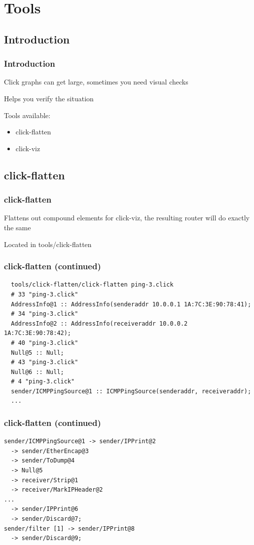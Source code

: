 \documentclass{beamer}
\begin{document}
\section{Tools}
\subsection{Introduction} %
\label{sub:introduction}

\begin{frame}
\frametitle{Introduction}
Click graphs can get large, sometimes you need visual checks

Helps you verify the situation

Tools available:
\begin{itemize}
	\item click-flatten
	\item click-viz
\end{itemize}
\end{frame}

\subsection{click-flatten} %
\label{sub:click_flatten}

\begin{frame}[fragile]
\frametitle{click-flatten}
Flattens out compound elements for click-viz, the resulting router will do exactly the same

Located in tools/click-flatten
\end{frame}

\begin{frame}[fragile]
\frametitle{click-flatten (continued)}
\begin{lstlisting}
  tools/click-flatten/click-flatten ping-3.click
  # 33 "ping-3.click"
  AddressInfo@1 :: AddressInfo(senderaddr 10.0.0.1 1A:7C:3E:90:78:41);
  # 34 "ping-3.click"
  AddressInfo@2 :: AddressInfo(receiveraddr 10.0.0.2 1A:7C:3E:90:78:42);
  # 40 "ping-3.click"
  Null@5 :: Null;
  # 43 "ping-3.click"
  Null@6 :: Null;
  # 4 "ping-3.click"
  sender/ICMPPingSource@1 :: ICMPPingSource(senderaddr, receiveraddr);
  ...
\end{lstlisting}
\end{frame}

\begin{frame}[fragile]
\frametitle{click-flatten (continued)}
\begin{lstlisting}
sender/ICMPPingSource@1 -> sender/IPPrint@2
  -> sender/EtherEncap@3
  -> sender/ToDump@4
  -> Null@5
  -> receiver/Strip@1
  -> receiver/MarkIPHeader@2
...
  -> sender/IPPrint@6
  -> sender/Discard@7;
sender/filter [1] -> sender/IPPrint@8
  -> sender/Discard@9;
\end{lstlisting}
\end{frame}
\end{document}
